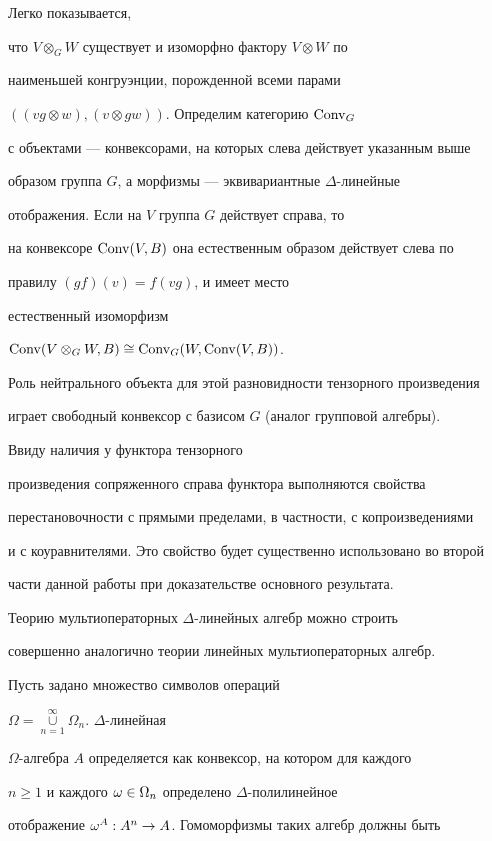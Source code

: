 Легко показывается,


что $V\otimes_G W$ существует и изоморфно фактору $V\otimes W$ по


наименьшей конгруэнции, порожденной всеми парами


$((v g \otimes w), (v \otimes g w))$. Определим категорию $\operatorname{Conv}_G$


с объектами --- конвексорами, на которых слева действует указанным выше


образом группа $G$, а морфизмы --- эквивариантные $\Delta$-линейные


отображения. Если на $V$ группа $G$ действует справа, то


на конвексоре $\operatorname{Conv}(V,B)$ она естественным образом действует слева по


правилу $(g f)(v)=f(v g)$, и имеет место


естественный изоморфизм


$\operatorname{Conv}(V\otimes_G W, B)\cong \operatorname{Conv}_G(W, \operatorname{Conv}(V, B))$.


Роль нейтрального объекта для этой разновидности тензорного произведения


играет свободный конвексор с базисом $G$ (аналог групповой алгебры).


Ввиду наличия у функтора тензорного


произведения сопряженного справа функтора выполняются свойства


перестановочности с прямыми пределами, в частности, с копроизведениями


и с коуравнителями. Это свойство будет существенно использовано во второй


части данной работы при доказательстве основного результата.





Теорию мультиоператорных $\Delta$-линейных алгебр можно строить


совершенно аналогично теории линейных мультиоператорных алгебр.


Пусть задано множество символов операций


$\Omega=\mathop{\cup}\limits_{n=1}^\infty \Omega_n$.\; $\Delta$-линейная


$\Omega$-алгебра $A$ определяется как конвексор, на котором для каждого


$n\ge 1$ и каждого $\omega\in \Omega_n$ определено $\Delta$-полилинейное


отображение $\omega^A: A^n\to A$. Гомоморфизмы таких алгебр должны быть


